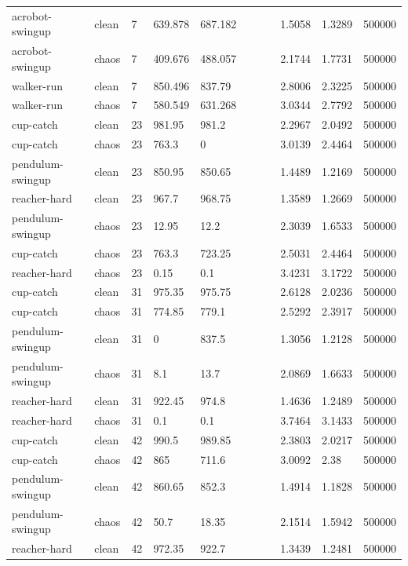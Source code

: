 \begin{tabular}{lllllllllll}
acrobot-swingup & clean & 7 & 639.878 & 687.182 &  &  &  & 1.5058 & 1.3289 & 500000 \\
acrobot-swingup & chaos & 7 & 409.676 & 488.057 &  &  &  & 2.1744 & 1.7731 & 500000 \\
walker-run & clean & 7 & 850.496 & 837.79 &  &  &  & 2.8006 & 2.3225 & 500000 \\
walker-run & chaos & 7 & 580.549 & 631.268 &  &  &  & 3.0344 & 2.7792 & 500000 \\
cup-catch & clean & 23 & 981.95 & 981.2 &  &  &  & 2.2967 & 2.0492 & 500000 \\
cup-catch & chaos & 23 & 763.3 & 0 &  &  &  & 3.0139 & 2.4464 & 500000 \\
pendulum-swingup & clean & 23 & 850.95 & 850.65 &  &  &  & 1.4489 & 1.2169 & 500000 \\
reacher-hard & clean & 23 & 967.7 & 968.75 &  &  &  & 1.3589 & 1.2669 & 500000 \\
pendulum-swingup & chaos & 23 & 12.95 & 12.2 &  &  &  & 2.3039 & 1.6533 & 500000 \\
cup-catch & chaos & 23 & 763.3 & 723.25 &  &  &  & 2.5031 & 2.4464 & 500000 \\
reacher-hard & chaos & 23 & 0.15 & 0.1 &  &  &  & 3.4231 & 3.1722 & 500000 \\
cup-catch & clean & 31 & 975.35 & 975.75 &  &  &  & 2.6128 & 2.0236 & 500000 \\
cup-catch & chaos & 31 & 774.85 & 779.1 &  &  &  & 2.5292 & 2.3917 & 500000 \\
pendulum-swingup & clean & 31 & 0 & 837.5 &  &  &  & 1.3056 & 1.2128 & 500000 \\
pendulum-swingup & chaos & 31 & 8.1 & 13.7 &  &  &  & 2.0869 & 1.6633 & 500000 \\
reacher-hard & clean & 31 & 922.45 & 974.8 &  &  &  & 1.4636 & 1.2489 & 500000 \\
reacher-hard & chaos & 31 & 0.1 & 0.1 &  &  &  & 3.7464 & 3.1433 & 500000 \\
cup-catch & clean & 42 & 990.5 & 989.85 &  &  &  & 2.3803 & 2.0217 & 500000 \\
cup-catch & chaos & 42 & 865 & 711.6 &  &  &  & 3.0092 & 2.38 & 500000 \\
pendulum-swingup & clean & 42 & 860.65 & 852.3 &  &  &  & 1.4914 & 1.1828 & 500000 \\
pendulum-swingup & chaos & 42 & 50.7 & 18.35 &  &  &  & 2.1514 & 1.5942 & 500000 \\
reacher-hard & clean & 42 & 972.35 & 922.7 &  &  &  & 1.3439 & 1.2481 & 500000 \\

\end{tabular}
